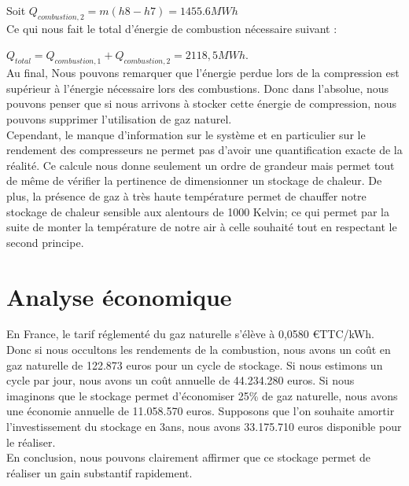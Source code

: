 Soit $Q_{combustion,2}=m(h8-h7)=1455.6MWh$\\


Ce qui nous fait le total d'énergie de combustion nécessaire suivant :

 $Q_{total}=Q_{combustion,1}+Q_{combustion,2}=2118,5MWh$.\\

Au final, Nous pouvons remarquer que l'énergie perdue lors de la compression est supérieur à l'énergie nécessaire lors des combustions. Donc dans l'absolue, nous pouvons penser que si nous arrivons à stocker cette énergie de compression, nous pouvons supprimer l'utilisation de gaz naturel.\\

 Cependant, le manque d'information sur le système et en particulier sur le rendement des compresseurs ne permet pas d'avoir une quantification exacte de la réalité. Ce calcule nous donne seulement un ordre de grandeur mais permet tout de même de vérifier la pertinence de dimensionner un stockage de chaleur. De plus, la présence de gaz à très haute température permet de chauffer notre stockage de chaleur sensible aux alentours de 1000 Kelvin; ce qui permet par la suite de monter la température de notre air à celle souhaité tout en respectant le second principe.


\section{Analyse économique}

En France, le tarif réglementé du gaz naturelle s'élève à 0,0580 \euro TTC/kWh. Donc si nous occultons les rendements de la combustion, nous avons un coût en gaz naturelle de 122.873 euros pour un cycle de stockage. Si nous estimons un cycle par jour, nous avons un coût annuelle de 44.234.280 euros. Si nous imaginons que le stockage permet d'économiser 25\% de gaz naturelle, nous avons une économie annuelle de 11.058.570 euros. Supposons que l'on souhaite amortir l'investissement du stockage en 3ans, nous avons 33.175.710 euros disponible pour le réaliser. \\

En conclusion, nous pouvons clairement affirmer que ce stockage permet de réaliser un gain substantif rapidement.












